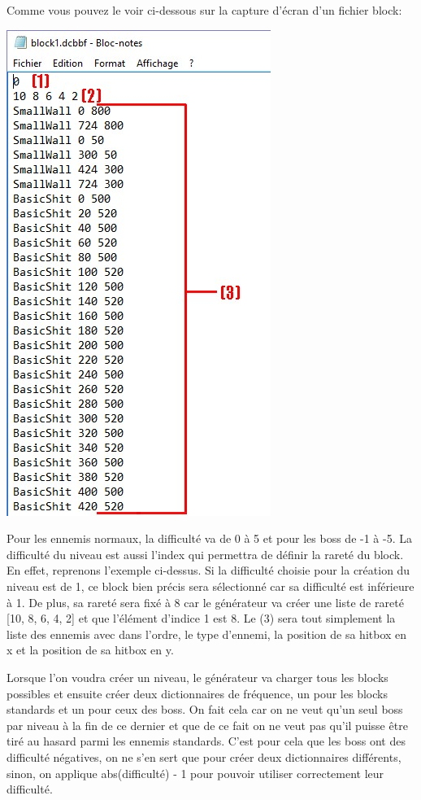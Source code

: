 \documentclass{article}
\begin{document}
Comme vous pouvez le voir ci-dessous sur la capture d'écran d'un fichier block:

\begin{center}
\includegraphics[scale=0.75]{images/explaindcbbf.jpg}
\end{center}

Pour les ennemis normaux, la difficulté va de 0 à 5 et pour les boss de -1 à -5. La difficulté du niveau est aussi l'index qui permettra de définir la rareté du block. En effet, reprenons l'exemple ci-dessus. Si la difficulté choisie pour la création du niveau est de 1, ce block bien précis sera sélectionné car sa difficulté est inférieure à 1. De plus, sa rareté sera fixé à 8 car le générateur va créer une liste de rareté [10, 8, 6, 4, 2] et que l'élément d'indice 1 est 8. Le (3) sera tout simplement la liste des ennemis avec dans l'ordre, le type d'ennemi, la position de sa hitbox en x et la position de sa hitbox en y. \newline

Lorsque l'on voudra créer un niveau, le générateur va charger tous les blocks possibles et ensuite créer deux dictionnaires de fréquence, un pour les blocks standards et un pour ceux des boss. On fait cela car on ne veut qu'un seul boss par niveau à la fin de ce dernier et que de ce fait on ne veut pas qu'il puisse être tiré au hasard parmi les ennemis standards. C'est pour cela que les boss ont des difficulté négatives, on ne s'en sert que pour créer deux dictionnaires différents, sinon, on applique abs(difficulté) - 1 pour pouvoir utiliser correctement leur difficulté. \newline
 
\end{document}
